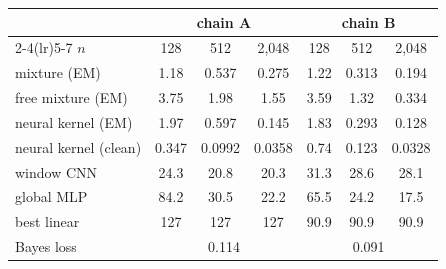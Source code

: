 \begin{tabular}{@{}lcccccc@{}}
\toprule
 & \multicolumn{3}{c}{chain A} & \multicolumn{3}{c}{chain B}\\
\cmidrule(lr){2-4}\cmidrule(lr){5-7}
$n$ & 128 & 512 & 2{,}048 & 128 & 512 & 2{,}048\\
\midrule
mixture (EM) & 1.18 & 0.537 & 0.275 & 1.22 & 0.313 & 0.194\\
free mixture (EM) & 3.75 & 1.98 & 1.55 & 3.59 & 1.32 & 0.334\\
neural kernel (EM) & 1.97 & 0.597 & 0.145 & 1.83 & 0.293 & 0.128\\
neural kernel (clean) & 0.347 & 0.0992 & 0.0358 & 0.74 & 0.123 & 0.0328\\
\midrule
window CNN & 24.3 & 20.8 & 20.3 & 31.3 & 28.6 & 28.1\\
global MLP & 84.2 & 30.5 & 22.2 & 65.5 & 24.2 & 17.5\\
\midrule
best linear & 127 & 127 & 127 & 90.9 & 90.9 & 90.9\\
\midrule
Bayes loss & \multicolumn{3}{c}{0.114} & \multicolumn{3}{c}{0.091}\\
\bottomrule
\end{tabular}

